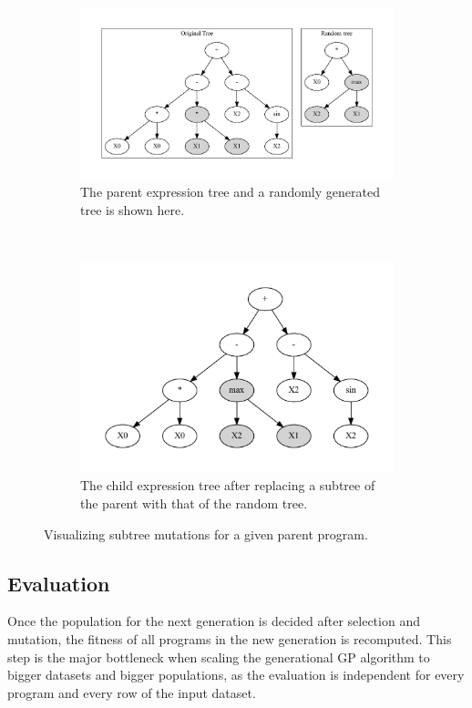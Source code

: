 \begin{figure}[htp]
  \centering
  \begin{subfigure}{\textwidth}
    \raggedleft
    \includegraphics[scale=0.75]{images/graphviz/subtree_before.dot.pdf}
    \caption{The parent expression tree and a randomly generated tree is shown here.}
    \label{fig:subtree_muta}
  \end{subfigure}%
  \\
  \begin{subfigure}{\textwidth}
    \centering
    \includegraphics[scale=0.75]{images/graphviz/subtree_after.dot.pdf}
    \caption{The child expression tree after replacing a subtree of the parent with that of the random tree.}
    \label{fig:subtree_mutb}
  \end{subfigure}
  \caption{Visualizing subtree mutations for a given parent program.}
  
  \label{fig:subtree}
\end{figure}
  
\subsection{Evaluation}
\label{subsec:evaluation}
Once the population for the next generation is decided after selection and mutation, the fitness of all programs in the new generation is recomputed. This step is the major bottleneck when scaling the generational GP algorithm to bigger datasets and bigger populations, as the evaluation is independent for every program and every row of the input dataset. 

